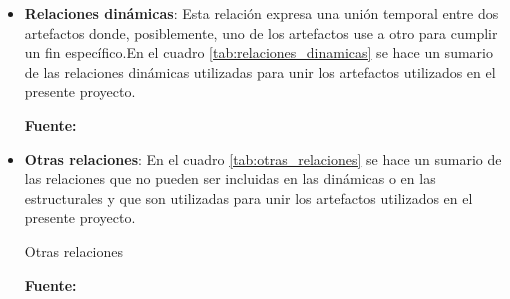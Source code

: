 \begin{itemize}
\item \textbf{Relaciones dinámicas}: Esta relación expresa una unión temporal entre dos artefactos donde, posiblemente, uno de los artefactos use a otro para cumplir un fin específico.En el cuadro \ref{tab:relaciones_dinamicas} se hace un sumario de las relaciones dinámicas utilizadas para unir los artefactos utilizados en el presente proyecto.

\begin{table}
  \caption{Relaciones dinámicas}
  \label{tab:relaciones_dinamicas}

  \begin{center}
  
  \textbf{Fuente:} \cite{archimate2}
  
    \end{center}
\end{table}

\item \textbf{Otras relaciones}: En el cuadro \ref{tab:otras_relaciones} se hace un sumario de las relaciones que no pueden ser incluidas en las dinámicas o en las estructurales y que son utilizadas para unir los artefactos utilizados en el presente proyecto.

\begin{table}
  \caption{Otras relaciones}
  \label{tab:otras_relaciones}

  \begin{center}
  
  \textbf{Fuente:} \cite{archimate2}
  

\end{center}
\end{table}
\end{itemize}
